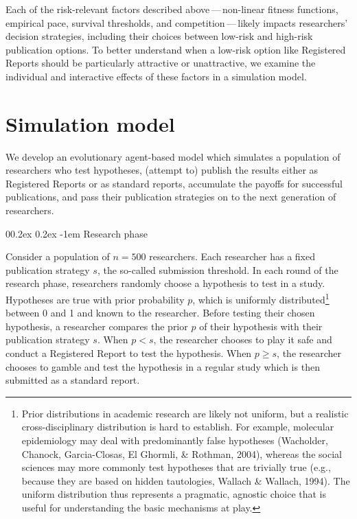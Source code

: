 \documentclass[
  ,man,mask,floatsintext]{apa6}
\makeatletter
\let\oldparagraph\paragraph
\renewcommand{\paragraph}[1]{\oldparagraph{#1}\mbox{}}
\renewcommand{\paragraph}{\@startsection{paragraph}{4}{\parindent}%
  {0\baselineskip \@plus 0.2ex \@minus 0.2ex}%
  {-1em}%
  {\normalfont\normalsize\bfseries\itshape\typesectitle}}
\makeatother
\begin{document}
Each of the risk-relevant factors described above\(\,\)---\(\,\)non-linear fitness functions, empirical pace, survival thresholds, and competition\(\,\)---\(\,\)likely impacts researchers' decision strategies, including their choices between low-risk and high-risk publication options.
To better understand when a low-risk option like Registered Reports should be particularly attractive or unattractive, we examine the individual and interactive effects of these factors in a simulation model.

\hypertarget{simulation-model}{%
\section{Simulation model}\label{simulation-model}}

We develop an evolutionary agent-based model which simulates a population of researchers who test hypotheses, (attempt to) publish the results either as Registered Reports or as standard reports, accumulate the payoffs for successful publications, and pass their publication strategies on to the next generation of researchers.

\hypertarget{research-phase}{%
\paragraph{Research phase}\label{research-phase}}

Consider a population of \(n = 500\) researchers.
Each researcher has a fixed publication strategy \(s\), the so-called submission threshold.
In each round of the research phase, researchers randomly choose a hypothesis to test in a study.
Hypotheses are true with prior probability \(p\), which is uniformly distributed\footnote{Prior distributions in academic research are likely not uniform, but a realistic cross-disciplinary distribution is hard to establish. For example, molecular epidemiology may deal with predominantly false hypotheses (Wacholder, Chanock, Garcia-Closas, El Ghormli, \& Rothman, 2004), whereas the social sciences may more commonly test hypotheses that are trivially true (e.g., because they are based on hidden tautologies, Wallach \& Wallach, 1994). The uniform distribution thus represents a pragmatic, agnostic choice that is useful for understanding the basic mechanisms at play.} between 0 and 1 and known to the researcher.
Before testing their chosen hypothesis, a researcher compares the prior \(p\) of their hypothesis with their publication strategy \(s\).
When \(p < s\), the researcher chooses to play it safe and conduct a Registered Report to test the hypothesis.
When \(p \geq s\), the researcher chooses to gamble and test the hypothesis in a regular study which is then submitted as a standard report.
\end{document}
